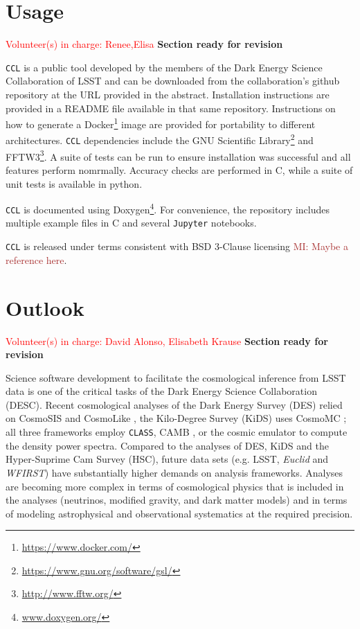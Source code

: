 \documentclass[\docopts]{\docclass}
\newcommand{\vol}[1]{\textcolor{red}{Volunteer(s) in charge: #1}}
\newcommand{\revise}{\textcolor{red!55!blue}{\bf Section ready for revision}}
\newcommand{\mi}[1]{\textcolor{brown}{MI: #1}}
\newcommand{\ccl}{{\tt CCL}\xspace}
\begin{document}
\section{Usage}
\label{sec:usage}
\vol{Renee,Elisa}
\revise

\ccl is a public tool developed by the members of the Dark Energy Science Collaboration of LSST and can be downloaded from the collaboration's github repository at the URL provided in the abstract. Installation instructions are provided in a README file available in that same repository. Instructions on how to generate a Docker\footnote{\url{https://www.docker.com/}} image are provided for portability to different architectures. \ccl dependencies include the GNU Scientific Library\footnote{\url{https://www.gnu.org/software/gsl/}} and FFTW3\footnote{\url{http://www.fftw.org/}}. A suite of tests can be run to ensure installation was successful and all features perform nomrmally. Accuracy checks are performed in C, while a suite of unit tests is available in python.

\ccl is documented using Doxygen\footnote{\url{www.doxygen.org/}}. For convenience, the repository includes multiple example files in C and several {\tt Jupyter} notebooks.

\ccl is released under terms consistent with BSD 3-Clause licensing \mi{Maybe a reference here}. 

\section{Outlook}
\label{sec:conclusion}
\vol{David Alonso, Elisabeth Krause}
\revise

Science software development to facilitate the cosmological inference from LSST data is one of the critical tasks of the Dark Energy Science Collaboration (DESC). Recent cosmological analyses of the Dark Energy Survey (DES) relied on CosmoSIS \citep{Zuntz14} and CosmoLike \citep{krause17}, the Kilo-Degree Survey (KiDS) uses CosmoMC \citep{Lewis02}; all three frameworks employ {\tt CLASS}, CAMB \citep{Challinor2005}, or the cosmic emulator to compute the density power spectra. Compared to the analyses of DES, KiDS and the Hyper-Suprime Cam Survey (HSC), future data sets (e.g. LSST, {\it Euclid} and {\it WFIRST}) have substantially higher demands on analysis frameworks. Analyses are becoming more complex in terms of cosmological physics that is included in the analyses (neutrinos, modified gravity, and dark matter models) and in terms of modeling astrophysical and observational systematics at the required precision. 
\end{document}
